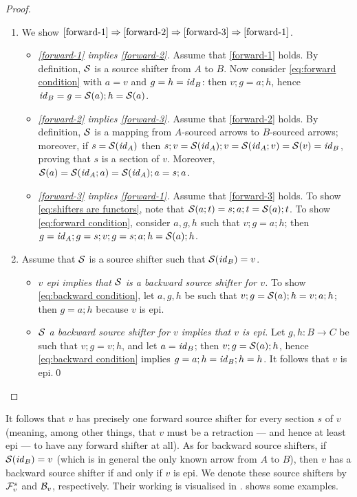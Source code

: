 \begin{proof}~
\begin{enumerate}[topsep=\smallskipamount]
\item
We show $\ref{forward-1} \Rightarrow \ref{forward-2} \Rightarrow \ref{forward-3} \Rightarrow \ref{forward-1}$.
\begin{itemize}
\item \emph{\ref{forward-1} implies \ref{forward-2}.}
%
Assume that \ref{forward-1} holds. By definition, $\mathcal{S}$ is a source shifter from $A$ to $B$. Now consider \eqref{eq:forward condition} with $a=v$ and $g=h=\mathit{id}_B$: then $v;g=a;h$, hence $\mathit{id}_B=g = \mathcal{S}(a);h=\mathcal{S}(a)$.

\item \emph{\ref{forward-2} implies \ref{forward-3}.}
%
Assume that \ref{forward-2} holds. By definition, $\mathcal{S}$ is a mapping from $A$-sourced arrows to $B$-sourced arrows; moreover, if $s=\mathcal{S}(\mathit{id}_A)$ then $s;v=\mathcal{S}(\mathit{id}_A);v=\mathcal{S}(\mathit{id}_A;v)=\mathcal{S}(v)=\mathit{id}_B$, proving that $s$ is a section of $v$. Moreover, $\mathcal{S}(a)=\mathcal{S}(\mathit{id}_A;a)=\mathcal{S}(\mathit{id}_A);a=s;a$.

\item \emph{\ref{forward-3} implies \ref{forward-1}.}
%
Assume that \ref{forward-3} holds. To show \eqref{eq:shifters are functors}, note that $\mathcal{S}(a;t)=s;a;t=\mathcal{S}(a);t$. To show \eqref{eq:forward condition}, consider $a,g,h$ such that $v;g=a;h$; then $g=\mathit{id}_A;g=s;v;g=s;a;h = \mathcal{S}(a);h$.
\end{itemize}

\item Assume that $\mathcal{S}$ is a source shifter such that $\mathcal{S}(\mathit{id}_B)=v$.
\begin{itemize}
\item \emph{$v$ epi implies that $\mathcal{S}$ is a backward source shifter for $v$.} To show \eqref{eq:backward condition}, let $a,g,h$ be such that $v;g=\mathcal{S}(a);h=v;a;h$; then $g=a;h$ because $v$ is epi.

\item \emph{$\mathcal{S}$ a backward source shifter for $v$ implies that $v$ is epi.} Let $g,h:B\to C$ be such that $v;g=v;h$, and let $a=\mathit{id}_B$; then $v;g=\mathcal{S}(a);h$, hence \eqref{eq:backward condition} implies $g=a;h=\mathit{id}_B;h=h$. It follows that $v$ is epi.\qed
\end{itemize}
\end{enumerate}
\end{proof}
%
It follows that $v$ has precisely one forward source shifter for every section $s$ of $v$ (meaning, among other things, that $v$ must be a retraction --- and hence at least epi --- to have any forward shifter at all). As for backward source shifters, if $\mathcal{S}(\mathit{id}_B)=v$ (which is in general the only known arrow from $A$ to $B$), then $v$ has a backward source shifter if and only if $v$ is epi. We denote these source shifters by $\mathcal{F}_v^s$ and $\mathcal{B}_v$, respectively. Their working is visualised in .  shows some examples.

